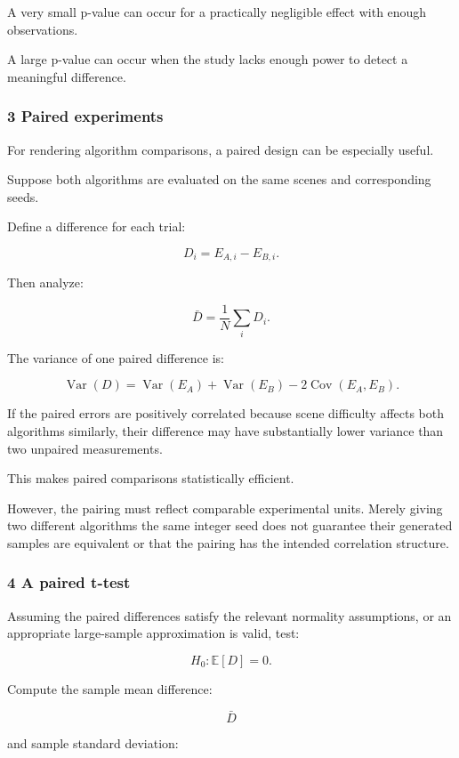 A very small p-value can occur for a practically negligible effect with enough observations.

A large p-value can occur when the study lacks enough power to detect a meaningful difference.

\subsubsection{3 Paired experiments}\label{02-foundations-ii-ch030-paired-experiments}

For rendering algorithm comparisons, a paired design can be especially useful.

Suppose both algorithms are evaluated on the same scenes and corresponding seeds.

Define a difference for each trial:

\[
 D_i=E_{A,i}-E_{B,i}.
\]

Then analyze:

\[
 \bar D=\frac1N\sum_iD_i.
\]

The variance of one paired difference is:

\[
 \operatorname{Var}(D) = \operatorname{Var}(E_A)+ \operatorname{Var}(E_B)- 2\operatorname{Cov}(E_A,E_B).
\]

If the paired errors are positively correlated because scene difficulty affects both algorithms similarly, their difference may have substantially lower variance than two unpaired measurements.

This makes paired comparisons statistically efficient.

However, the pairing must reflect comparable experimental units. Merely giving two different algorithms the same integer seed does not guarantee their generated samples are equivalent or that the pairing has the intended correlation structure.

\subsubsection{4 A paired t-test}\label{02-foundations-ii-ch030-a-paired-t-test}

Assuming the paired differences satisfy the relevant normality assumptions, or an appropriate large-sample approximation is valid, test:

\[
 H_0:\mathbb E[D]=0.
\]

Compute the sample mean difference:

\[
 \bar D
\]

and sample standard deviation:

